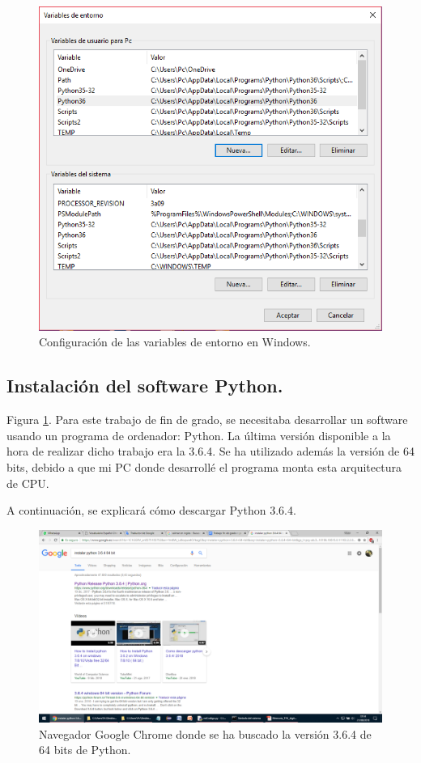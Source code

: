 \begin{figure}[h!]
  	\centering
	\includegraphics[width=\textwidth]{CapturasInstalacionPython/unnamed.png}
	\caption{Configuración de las variables de entorno en Windows.
	\label{fig:CapturasInstalacionPython/unnamed.png}}
\end{figure}

\subsection{Instalación del software Python.}

Figura \ref{fig:CapturasInstalacionPython/unnamed.png}. Para este trabajo de fin de grado, se necesitaba desarrollar un software usando un programa de ordenador: Python. La última versión disponible a la hora de realizar dicho trabajo era la 3.6.4. Se ha utilizado además la versión de 64 bits, debido a que mi PC donde desarrollé el programa monta esta arquitectura de CPU.

A continuación, se explicará cómo descargar Python 3.6.4.

\begin{figure}[h!]
  	\centering
	\includegraphics[width=\textwidth]{CapturasInstalacionPython/unnamed(1).png}
	\caption{Navegador Google Chrome donde se ha buscado la versión 3.6.4 de 64 bits de Python.
	\label{fig:CapturasInstalacionPython/unnamed(1).png}}
\end{figure}

